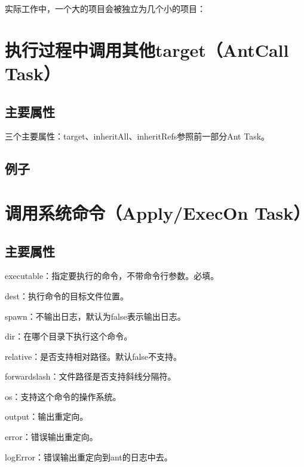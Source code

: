 实际工作中，一个大的项目会被独立为几个小的项目：









\section{执行过程中调用其他target（AntCall Task）}

\subsection{主要属性}

三个主要属性：target、inheritAll、inheritRefs参照前一部分Ant Task。

\subsection{例子}







\section{调用系统命令（Apply/ExecOn Task）}

\subsection{主要属性}

executable：指定要执行的命令，不带命令行参数。必填。

dest：执行命令的目标文件位置。

spawn：不输出日志，默认为false表示输出日志。

dir：在哪个目录下执行这个命令。

relative：是否支持相对路径。默认false不支持。

forwardslash：文件路径是否支持斜线分隔符。

os：支持这个命令的操作系统。

output：输出重定向。

error：错误输出重定向。

logError：错误输出重定向到ant的日志中去。

